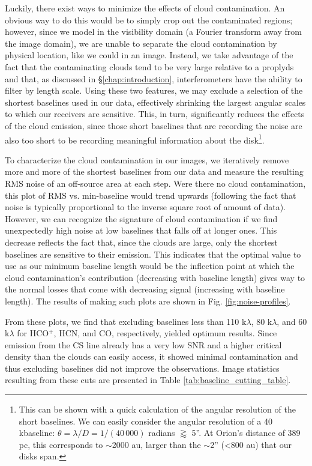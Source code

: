 Luckily, there exist ways to minimize the effects of cloud contamination. An obvious way to do this would be to simply crop out the contaminated regions; however, since we model in the visibility domain (a Fourier transform away from the image domain), we are unable to separate the cloud contamination by physical location, like we could in an image. Instead, we take advantage of the fact that the contaminating clouds tend to be very large relative to a proplyds and that, as discussed in \S\ref{chap:introduction}, interferometers have the ability to filter by length scale. Using these two features, we may exclude a selection of the shortest baselines used in our data, effectively shrinking the largest angular scales to which our receivers are sensitive. This, in turn, significantly reduces the effects of the cloud emission, since those short baselines that are recording the noise are also too short to be recording meaningful information about the disk\footnote{This can be shown with a quick calculation of the angular resolution of the short baselines. We can easily consider the angular resolution of a 40\,k\lambda baseline: $\theta = \lambda/D = 1/(40\,000)$ radians $\gtrapprox$ 5''. At Orion's distance of 389 pc, this corresponds to $\sim$2000 au, larger than the $\sim$2'' (\textless800 au) that our disks span.}.


To characterize the cloud contamination in our images, we iteratively remove more and more of the shortest baselines from our data and measure the resulting RMS noise of an off-source area at each step. Were there no cloud contamination, this plot of RMS vs. min-baseline would trend upwards (following the fact that noise is typically proportional to the inverse square root of amount of data). However, we can recognize the signature of cloud contamination if we find unexpectedly high noise at low baselines that falls off at longer ones. This decrease reflects the fact that, since the clouds are large, only the shortest baselines are sensitive to their emission. This indicates that the optimal value to use as our minimum baseline length would be the inflection point at which the cloud contamination's contribution (decreasing with baseline length) gives way to the normal losses that come with decreasing signal (increasing with baseline length). The results of making such plots are shown in Fig. \ref{fig:noise-profiles}.

From these plots, we find that excluding baselines less than 110 k$\lambda$, 80 k$\lambda$, and 60  k$\lambda$ for HCO$^{+}$, HCN, and CO, respectively, yielded optimum results. Since emission from the CS line already has a very low SNR and a higher critical density than the clouds can easily access, it showed minimal contamination and thus excluding baselines did not improve the observations. Image statistics resulting from these cuts are presented in Table \ref{tab:baseline_cutting_table}.

